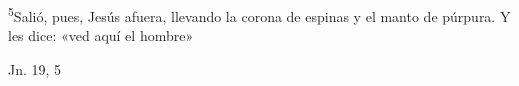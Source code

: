 \documentclass[../../rosario.tex]{subfiles}
\begin{document}
    \textsuperscript{5}Salió, pues, Jesús afuera, llevando la corona de espinas y el manto de púrpura. Y les dice: «ved aquí el hombre»
    \begin{flushright}
    Jn. 19, 5
    \end{flushright}
\end{document}

